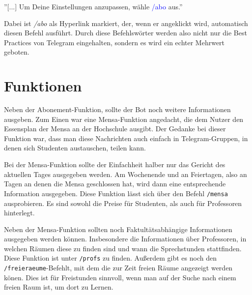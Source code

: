 ''[...] Um Deine Einstellungen anzupassen, wähle \textcolor{blue}{/abo} aus.''

Dabei ist \emph{/abo} als Hyperlink markiert, der, wenn er angeklickt wird, automatisch diesen Befehl ausführt. Durch diese Befehlswörter werden also nicht nur die Best Practices von Telegram eingehalten, sondern es wird ein echter Mehrwert geboten.

\section{Funktionen}
Neben der Abonement-Funktion, sollte der Bot noch weitere Informationen ausgeben. Zum Einen war eine Mensa-Funktion angedacht, die dem Nutzer den Essensplan der Mensa an der Hochschule ausgibt. Der Gedanke bei dieser Funktion war, dass man diese Nachrichten auch einfach in Telegram-Gruppen, in denen sich Studenten austauschen, teilen kann.

Bei der Mensa-Funktion sollte der Einfachheit halber nur das Gericht des aktuellen Tages ausgegeben werden. Am Wochenende und an Feiertagen, also an Tagen an denen die Mensa geschlossen hat, wird dann eine entsprechende Information ausgegeben. Diese Funktion lässt sich über den Befehl \texttt{/mensa} ausprobieren. Es sind sowohl die Preise für Studenten, als auch für Professoren hinterlegt.

Neben der Mensa-Funktion sollten noch Faktultätsabhängige Informationen ausgegeben werden können. Insbesondere die Informationen über Professoren, in welchen Räumen diese zu finden sind und wann die Sprechstunden stattfinden. Diese Funktion ist unter \texttt{/profs} zu finden. Außerdem gibt es noch den \texttt{/freieraeume}-Befehlt, mit dem die zur Zeit freien Räume angezeigt werden könen. Dies ist für Freistunden sinnvoll, wenn man auf der Suche nach einem freien Raum ist, um dort zu Lernen.
